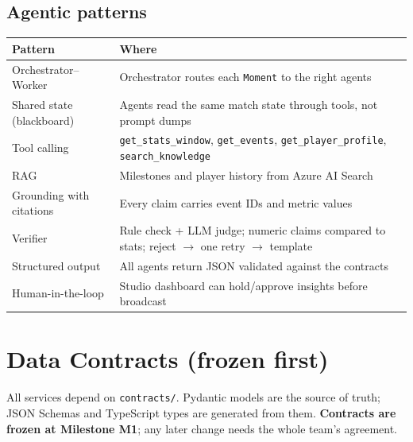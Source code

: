 \documentclass[11pt,a4paper]{article}
\begin{document}
\subsection{Agentic patterns}
\begin{tabularx}{\linewidth}{@{}l Y@{}}
\toprule
Pattern & Where \\
\midrule
Orchestrator--Worker      & Orchestrator routes each \texttt{Moment} to the right agents \\
Shared state (blackboard) & Agents read the same match state through tools, not prompt dumps \\
Tool calling              & \texttt{get\_stats\_window}, \texttt{get\_events}, \texttt{get\_player\_profile}, \texttt{search\_knowledge} \\
RAG                       & Milestones and player history from Azure AI Search \\
Grounding with citations  & Every claim carries event IDs and metric values \\
Verifier                  & Rule check + LLM judge; numeric claims compared to stats; reject $\rightarrow$ one retry $\rightarrow$ template \\
Structured output         & All agents return JSON validated against the contracts \\
Human-in-the-loop         & Studio dashboard can hold/approve insights before broadcast \\
\bottomrule
\end{tabularx}

\section{Data Contracts (frozen first)}
All services depend on \texttt{contracts/}. Pydantic models are the source of truth; JSON Schemas
and TypeScript types are generated from them. \textbf{Contracts are frozen at Milestone M1}; any
later change needs the whole team's agreement.
\end{document}
